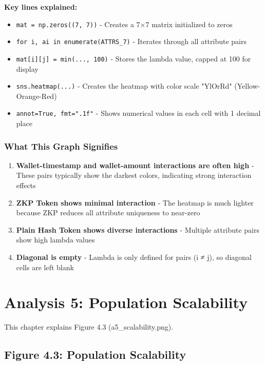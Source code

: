 \documentclass[12pt,a4paper,oneside,openany]{report}
\begin{document}
\textbf{Key lines explained:}
\begin{itemize}
    \item \texttt{mat = np.zeros((7, 7))} - Creates a 7×7 matrix initialized to zeros
    \item \texttt{for i, ai in enumerate(ATTRS\_7)} - Iterates through all attribute pairs
    \item \texttt{mat[i][j] = min(..., 100)} - Stores the lambda value, capped at 100 for display
    \item \texttt{sns.heatmap(...)} - Creates the heatmap with color scale "YlOrRd" (Yellow-Orange-Red)
    \item \texttt{annot=True, fmt=".1f"} - Shows numerical values in each cell with 1 decimal place
\end{itemize}

\subsection{What This Graph Signifies}
\begin{enumerate}
    \item \textbf{Wallet-timestamp and wallet-amount interactions are often high} - These pairs typically show the darkest colors, indicating strong interaction effects
    \item \textbf{ZKP Token shows minimal interaction} - The heatmap is much lighter because ZKP reduces all attribute uniqueness to near-zero
    \item \textbf{Plain Hash Token shows diverse interactions} - Multiple attribute pairs show high lambda values
    \item \textbf{Diagonal is empty} - Lambda is only defined for pairs (i ≠ j), so diagonal cells are left blank
\end{enumerate}

\chapter{Analysis 5: Population Scalability}
\label{chap:a5}

This chapter explains Figure 4.3 (a5\_scalability.png).

\section{Figure 4.3: Population Scalability}
\label{sec:f4.3}
\end{document}
